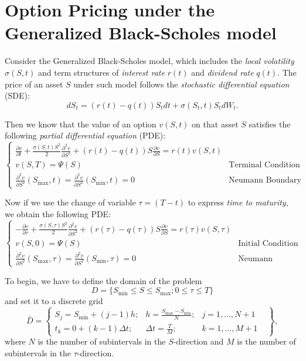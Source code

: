 \section{Option Pricing under the Generalized Black-Scholes model}
\label{sec:FD:GBS_PDE}
Consider the Generalized Black-Scholes model, which includes the \textit{local volatility} $\sigma(S,t)$ and term structures of \textit{interest rate} $r(t)$ and \textit{dividend rate} $q(t)$. The price of an asset $S$ under such model follows the \textit{stochastic differential equation} (SDE):
$$dS_t = (r(t)-q(t))S_t dt + \sigma(S_t,t)S_tdW_t.$$

Then we know that the value of an option $v(S,t)$ on that asset $S$ satisfies the following \textit{partial differential equation} (PDE):
$$\begin{cases}
\frac{\partial v}{\partial t} + \frac{\sigma(S,t)S^2}{2}\frac{\partial^2 v}{\partial S^2}+(r(t)-q(t))S\frac{\partial v}{\partial S}= r(t)v(S,t)\\
v(S,T) = \Psi(S) & \text{Terminal Condition (Payoff function)}\\
\frac{\partial^2 v}{\partial S^2}(S_{\max},t)=\frac{\partial^2 v}{\partial S^2}(S_{\min},t)=0 &\text{Neumann Boundary Conditions}
\end{cases}$$

Now if we use the change of variable $\tau = (T-t)$ to express \textit{time to maturity}, we obtain the following PDE:
$$\begin{cases}
-\frac{\partial v}{\partial \tau} + \frac{\sigma(S,\tau)S^2}{2}\frac{\partial^2 v}{\partial S^2}+(r(\tau)-q(\tau))S\frac{\partial v}{\partial S}= r(\tau)v(S,\tau)\\
v(S,0) = \Psi(S) & \text{Initial Condition (Payoff function)}\\
\frac{\partial^2 v}{\partial S^2}(S_{\max},\tau)=\frac{\partial^2 v}{\partial S^2}(S_{\min},\tau)=0 &\text{Neumann Boundary Conditions}
\end{cases}$$

To begin, we have to define the domain of the problem $$D = \{S_{\min}\leq S\leq S_{\max} ; 0 \leq \tau \leq T\}$$
and set it to a discrete grid
$$\bar{D} = \begin{Bmatrix}
S_j = S_{\min}+(j-1)h; & h=\frac{S_{\max}-S_{\min}}{N}; & j = 1,\ldots,N+1 \\ t_k = 0 + (k-1)\Delta t; & \Delta t = \frac{T}{M}; &k = 1,\ldots,M+1 &
\end{Bmatrix},$$
where $N$ is the number of subintervals in the $S$-direction and $M$ is the number of subintervals in the $\tau$-direction.

